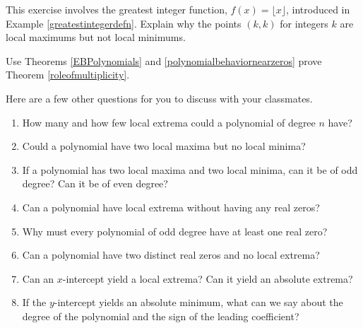 \documentclass{ximera}
\begin{document}
\begin{problem}
This exercise involves the greatest integer function, $f(x) = \lfloor x \rfloor$,  introduced in Example \ref{greatestintegerdefn}.  Explain why the points $(k,k)$ for integers $k$ are local maximums but not local minimums.
\end{problem}

\begin{problem}
Use Theorems  \ref{EBPolynomials}  and \ref{polynomialbehaviornearzeros} prove Theorem \ref{roleofmultiplicity}.
\item  
\end{problem}

\begin{problem}
Here are a few other questions for you to discuss with your classmates.  

\begin{enumerate}

\item How many and how few local extrema could a polynomial of degree $n$ have?  
\item Could a polynomial have two local maxima but no local minima?  
\item If a polynomial has two local maxima and two local minima, can it be of odd degree?  Can it be of even degree?
\item Can a polynomial have local extrema without having any real zeros?
\item Why must every polynomial of odd degree have at least one real zero?
\item Can a polynomial have two distinct real zeros and no local extrema?
\item Can an $x$-intercept yield a local extrema?  Can it yield an absolute extrema?
\item If the $y$-intercept yields an absolute minimum, what can we say about the degree of the polynomial and the sign of the leading coefficient?   

\end{enumerate}
\end{problem}
\end{document}

